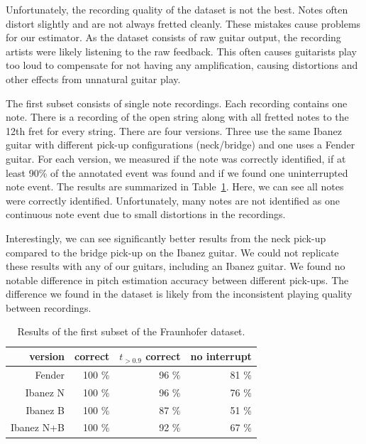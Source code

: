 \documentclass[a4paper,10pt,twocolumn]{article}
\begin{document}
Unfortunately, the recording quality of the dataset is not the best. Notes often distort slightly and are not always fretted cleanly. These mistakes cause problems for our estimator. As the dataset consists of raw guitar output, the recording artists were likely listening to the raw feedback. This often causes guitarists play too loud to compensate for not having any amplification, causing distortions and other effects from unnatural guitar play.

The first subset consists of single note recordings. Each recording contains one note. There is a recording of the open string along with all fretted notes to the 12th fret for every string. There are four versions. Three use the same Ibanez guitar with different pick-up configurations (neck/bridge) and one uses a Fender guitar. For each version, we measured if the note was correctly identified, if at least 90\% of the annotated event was found and if we found one uninterrupted note event. The results are summarized in Table~\ref{tab:expacc}. Here, we can see all notes were correctly identified. Unfortunately, many notes are not identified as one continuous note event due to small distortions in the recordings.

Interestingly, we can see significantly better results from the neck pick-up compared to the bridge pick-up on the Ibanez guitar. We could not replicate these results with any of our guitars, including an Ibanez guitar. We found no notable difference in pitch estimation accuracy between different pick-ups. The difference we found in the dataset is likely from the inconsistent playing quality between recordings.
\begin{table}[h]
    \centering
    \begin{tabular}{r|rrr}
        version     & correct & $t_{>0.9}$ correct & no interrupt \\
        \hline
        Fender      & 100 \%  & 96 \%   & 81 \% \\
        Ibanez N    & 100 \%  & 96 \%   & 76 \% \\
        Ibanez B    & 100 \%  & 87 \%   & 51 \% \\
        Ibanez N+B  & 100 \%  & 92 \%   & 67 \%
    \end{tabular}
    \caption{Results of the first subset of the Fraunhofer dataset.}
    \label{tab:expacc}
\end{table}
\end{document}

